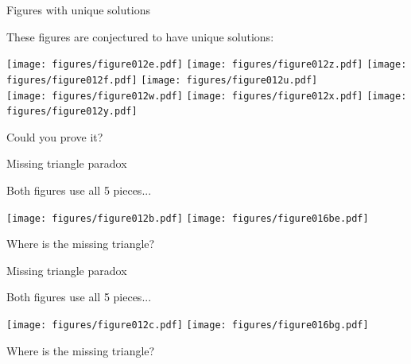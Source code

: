\documentclass[14pt]{beamer}
\begin{document}
    \begin{frame}{Figures with unique solutions}

        \vspace{-1em}
        \begin{center}
            These figures are conjectured to have unique solutions:

            \bigskip\medskip

            \texttt{[image: figures/figure012e.pdf]}\quad
            \texttt{[image: figures/figure012z.pdf]}\quad
            \texttt{[image: figures/figure012f.pdf]}\quad
            \texttt{[image: figures/figure012u.pdf]} \\[3ex]
            \texttt{[image: figures/figure012w.pdf]}\quad
            \texttt{[image: figures/figure012x.pdf]}\quad
            \texttt{[image: figures/figure012y.pdf]} \\

            \bigskip\medskip

            Could you prove it?
        \end{center}
    \end{frame}


    \begin{frame}{Missing triangle paradox}
        \begin{center}
            Both figures use all 5 pieces...

            \vspace{36pt}

            \;\;\texttt{[image: figures/figure012b.pdf]}\qquad
            \qquad
            \texttt{[image: figures/figure016be.pdf]}\;\;\,

            \vspace{32pt}

            Where is the missing triangle?
        \end{center}
    \end{frame}


    \begin{frame}{Missing triangle paradox}
        \begin{center}
            Both figures use all 5 pieces...

            \vspace{36pt}

            \;\;\texttt{[image: figures/figure012c.pdf]}\qquad
            \qquad
            \texttt{[image: figures/figure016bg.pdf]}\;\;\,

            \vspace{32pt}

            Where is the missing triangle?
        \end{center}
    \end{frame}
\end{document}
